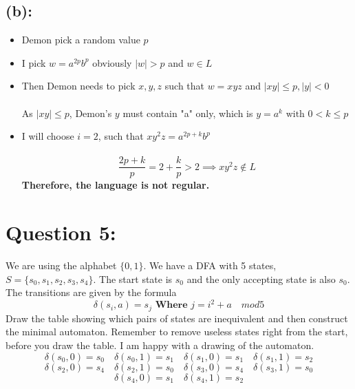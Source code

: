 \documentclass [9 pt]{article}
\theoremstyle{definition}
\begin{document}
\subsection*{(b):}
\begin{itemize}
	\item Demon pick a random value $p$ \\
	
	\item I pick $w = a^{2p}b^p$ obviously $|w| > p$ and $w \in L$ \\
	
	\item Then Demon needs to pick $x, y, z$ such that $w = xyz$ and $|xy| \leq p, |y| < 0$ \\\\
	As $|xy| \leq p$, Demon's $y$ must contain "a" only, which is  $ y  = a^{k}\text{ with } 0 < k \leq p$ \\
	
	
	\item I will choose $i = 2$, such that $xy^2z = a^{2p +  k}b^{p} $\\ \\
	$$ \dfrac{2p+k}{p} = 2 + \dfrac{k}{p} > 2 \implies xy^2z \notin L $$
	\newline
	\textbf{ Therefore, the language is not regular. }
\end{itemize}

\newpage
\section*{Question 5:}
We are using the alphabet $\{0,1\}$. We have a DFA with 5 states, $S = \{s_0, s_1, s_2, s_3, s_4\}$. The start state is $s_0$ and the only accepting state is also $s_0$. The transitions are given by the formula
$$\delta(s_i,a) = s_j\textbf{ Where  }  j=i^2+a\quad mod 5$$
Draw the table showing which pairs of states are inequivalent and then construct the minimal automaton. Remember to remove useless states right from the start, before you draw the table. I am happy with a drawing of the automaton.
\\ \newline \newline \newline\newline
$$\delta(s_0,0) = s_0 \quad \delta(s_0,1) = s_1  \quad \delta(s_1,0) = s_1  \quad \delta(s_1,1) = s_2     $$
$$\delta(s_2,0) = s_4 \quad \delta(s_2,1) = s_0  \quad \delta(s_3,0) = s_4  \quad \delta(s_3,1) = s_0    $$
 $$\delta(s_4,0) = s_1  \quad \delta(s_4,1) = s_2     $$
\end{document}
